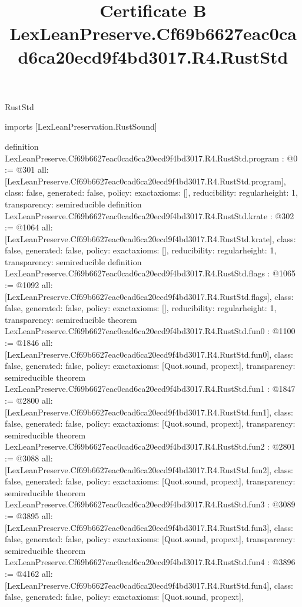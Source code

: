 \begin{lexlean}{RustStd}
\title{Certificate B LexLeanPreserve.Cf69b6627eac0cad6ca20ecd9f4bd3017.R4.RustStd}
\begin{coremodule}
imports [LexLeanPreservation.RustSound]

definition LexLeanPreserve.Cf69b6627eac0cad6ca20ecd9f4bd3017.R4.RustStd.program : @0 := @301 {
  all: [LexLeanPreserve.Cf69b6627eac0cad6ca20ecd9f4bd3017.R4.RustStd.program],
  class: false,
  generated: false,
  policy: exact{axioms: []},
  reducibility: regular{height: 1},
  transparency: semireducible
}
definition LexLeanPreserve.Cf69b6627eac0cad6ca20ecd9f4bd3017.R4.RustStd.krate : @302 := @1064 {
  all: [LexLeanPreserve.Cf69b6627eac0cad6ca20ecd9f4bd3017.R4.RustStd.krate],
  class: false,
  generated: false,
  policy: exact{axioms: []},
  reducibility: regular{height: 1},
  transparency: semireducible
}
definition LexLeanPreserve.Cf69b6627eac0cad6ca20ecd9f4bd3017.R4.RustStd.flags : @1065 := @1092 {
  all: [LexLeanPreserve.Cf69b6627eac0cad6ca20ecd9f4bd3017.R4.RustStd.flags],
  class: false,
  generated: false,
  policy: exact{axioms: []},
  reducibility: regular{height: 1},
  transparency: semireducible
}
theorem LexLeanPreserve.Cf69b6627eac0cad6ca20ecd9f4bd3017.R4.RustStd.fun0 : @1100 := @1846 {
  all: [LexLeanPreserve.Cf69b6627eac0cad6ca20ecd9f4bd3017.R4.RustStd.fun0],
  class: false,
  generated: false,
  policy: exact{axioms: [Quot.sound, propext]},
  transparency: semireducible
}
theorem LexLeanPreserve.Cf69b6627eac0cad6ca20ecd9f4bd3017.R4.RustStd.fun1 : @1847 := @2800 {
  all: [LexLeanPreserve.Cf69b6627eac0cad6ca20ecd9f4bd3017.R4.RustStd.fun1],
  class: false,
  generated: false,
  policy: exact{axioms: [Quot.sound, propext]},
  transparency: semireducible
}
theorem LexLeanPreserve.Cf69b6627eac0cad6ca20ecd9f4bd3017.R4.RustStd.fun2 : @2801 := @3088 {
  all: [LexLeanPreserve.Cf69b6627eac0cad6ca20ecd9f4bd3017.R4.RustStd.fun2],
  class: false,
  generated: false,
  policy: exact{axioms: [Quot.sound, propext]},
  transparency: semireducible
}
theorem LexLeanPreserve.Cf69b6627eac0cad6ca20ecd9f4bd3017.R4.RustStd.fun3 : @3089 := @3895 {
  all: [LexLeanPreserve.Cf69b6627eac0cad6ca20ecd9f4bd3017.R4.RustStd.fun3],
  class: false,
  generated: false,
  policy: exact{axioms: [Quot.sound, propext]},
  transparency: semireducible
}
theorem LexLeanPreserve.Cf69b6627eac0cad6ca20ecd9f4bd3017.R4.RustStd.fun4 : @3896 := @4162 {
  all: [LexLeanPreserve.Cf69b6627eac0cad6ca20ecd9f4bd3017.R4.RustStd.fun4],
  class: false,
  generated: false,
  policy: exact{axioms: [Quot.sound, propext]},
}
\end{coremodule}
\end{lexlean}
